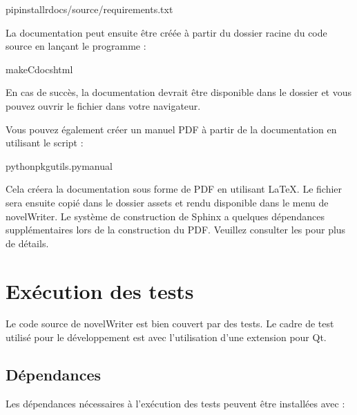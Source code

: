 \documentclass[a4paper,11pt,french]{sphinxmanual}
\begin{document}
\begin{sphinxVerbatim}[commandchars=\\\{\}]
pipinstall\PYGZhy{}rdocs/source/requirements.txt
\end{sphinxVerbatim}

\sphinxAtStartPar
La documentation peut ensuite être créée à partir du dossier racine du code source en lançant le programme :

\begin{sphinxVerbatim}[commandchars=\\\{\}]
make\PYGZhy{}Cdocshtml
\end{sphinxVerbatim}

\sphinxAtStartPar
En cas de succès, la documentation devrait être disponible dans le dossier  et vous pouvez ouvrir le fichier  dans votre navigateur.

\sphinxAtStartPar
Vous pouvez également créer un manuel PDF à partir de la documentation en utilisant le script  :

\begin{sphinxVerbatim}[commandchars=\\\{\}]
pythonpkgutils.pymanual
\end{sphinxVerbatim}

\sphinxAtStartPar
Cela créera la documentation sous forme de PDF en utilisant LaTeX. Le fichier sera ensuite copié dans le dossier assets et rendu disponible dans le menu  de novelWriter. Le système de construction de Sphinx a quelques dépendances supplémentaires lors de la construction du PDF. Veuillez consulter les  pour plus de détails.

\sphinxstepscope


\chapter{Exécution des tests}
\label{\detokenize{tech_tests:running-tests}}\label{\detokenize{tech_tests:a-pytest}}\label{\detokenize{tech_tests::doc}}
\sphinxAtStartPar
Le code source de novelWriter est bien couvert par des tests. Le cadre de test utilisé pour le développement est  avec l’utilisation d’une extension pour Qt.


\section{Dépendances}
\label{\detokenize{tech_tests:dependencies}}
\sphinxAtStartPar
Les dépendances nécessaires à l’exécution des tests peuvent être installées avec :
\end{document}
